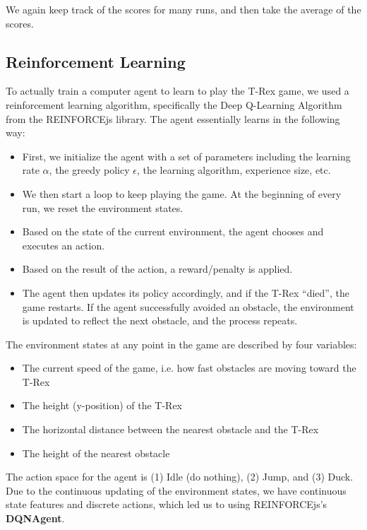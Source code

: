 \documentclass{scrartcl}
\begin{document}
    We again keep track of the scores for many runs, and then take the average of the scores.

    \subsection{Reinforcement Learning}\label{ssec:RL}
    To actually train a computer agent to learn to play the T-Rex game, we used a reinforcement
    learning algorithm, specifically the Deep Q-Learning Algorithm from the REINFORCEjs library.
    The agent essentially learns in the following way:

    \begin{itemize}
        \item First, we initialize the agent with a set of parameters including
        the learning rate $\alpha$, the greedy policy $\epsilon$, the learning
        algorithm, experience size, etc.
        \item We then start a loop to keep playing the game. At the beginning of
         every run, we reset the environment states.
        \item Based on the state of the current environment, the agent chooses
        and executes an action.
        \item Based on the result of the action, a reward/penalty is applied.
        \item The agent then updates its policy accordingly, and if the T-Rex
        ``died'', the game restarts. If the agent successfully avoided an
        obstacle, the environment is updated to reflect the next obstacle, and
        the process repeats.
    \end{itemize}

    The environment states at any point in the game are described by four variables:
    \begin{itemize}
        \item The current speed of the game, i.e. how fast obstacles are moving toward the T-Rex
        \item The height (y-position) of the T-Rex
        \item The horizontal distance between the nearest obstacle and the T-Rex
        \item The height of the nearest obstacle
    \end{itemize}

    The action space for the agent is (1) Idle (do nothing), (2) Jump, and (3)
    Duck. Due to the continuous updating of the environment states, we have
    continuous state features and discrete actions, which led us to using
    REINFORCEjs's \textbf{DQNAgent}.
\end{document}
